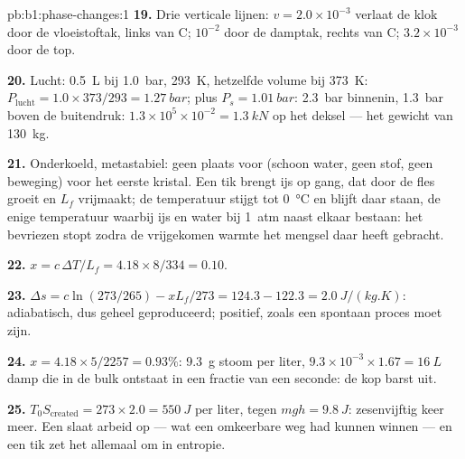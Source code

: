\begin{solution}{pb:b1:phase-changes:1}
\textbf{19.} Drie verticale lijnen: $v = 2.0 \times 10^{-3}$ verlaat de klok
door de vloeistoftak, links van C; $10^{-2}$ door de damptak,
rechts van C; $3.2 \times 10^{-3}$ door de top.

\textbf{20.} Lucht: \qty{0.5}{L} bij \qty{1.0}{bar}, \qty{293}{K}, hetzelfde volume bij
\qty{373}{K}: $P_{\text{lucht}} = 1.0 \times 373/293 = \qty{1.27}{bar}$; plus
$P_s = \qty{1.01}{bar}$: \qty{2.3}{bar} binnenin, \qty{1.3}{bar} boven de
buitendruk: $1.3 \times 10^5 \times 10^{-2} = \qty{1.3}{kN}$ op het deksel --- het
gewicht van \qty{130}{kg}.

\textbf{21.} Onderkoeld, metastabiel: geen plaats voor  (schoon water,
geen stof, geen beweging) voor het eerste kristal. Een tik brengt ijs op gang, dat
door de fles groeit en $L_f$ vrijmaakt; de temperatuur stijgt tot
\qty{0}{\degreeCelsius} en blijft daar staan, de enige temperatuur waarbij ijs
en water bij \qty{1}{atm} naast elkaar bestaan: het bevriezen stopt zodra
de vrijgekomen warmte het mengsel daar heeft gebracht.

\textbf{22.} $x = c\,\Delta T/L_f = 4.18 \times 8/334 = 0.10$.

\textbf{23.} $\Delta s = c\ln(273/265) - xL_f/273 = 124.3 - 122.3 =
\qty{+2.0}{J/(kg.K)}$: adiabatisch, dus geheel geproduceerd; positief, zoals een
spontaan proces moet zijn.

\textbf{24.} $x = 4.18 \times 5/2257 = 0.93\%$: \qty{9.3}{g} stoom per liter,
$9.3 \times 10^{-3} \times 1.67 = \qty{16}{L}$ damp die in de bulk ontstaat in een
fractie van een seconde: de kop barst uit.

\textbf{25.} $T_0S_{\mathrm{created}} = 273 \times 2.0 = \qty{550}{J}$ per liter,
tegen $mgh = \qty{9.8}{J}$: zesenvijftig keer meer. Een 
slaat arbeid op --- wat een omkeerbare weg had kunnen winnen --- en een
tik zet het allemaal om in entropie.
\end{solution}

